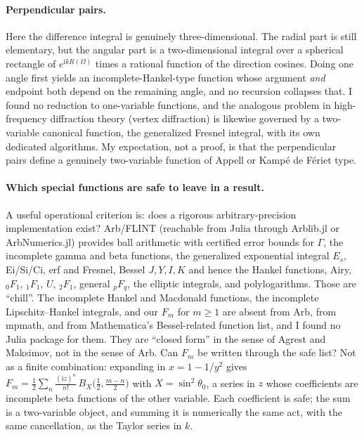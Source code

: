 \documentclass[11pt]{article}
\theoremstyle{remark}
\newcommand{\ii}{\mathrm{i}}
\begin{document}
\paragraph{Perpendicular pairs.} Here the difference integral is genuinely
three-dimensional. The radial part is still elementary, but the angular part is a
two-dimensional integral over a spherical rectangle of $e^{\ii kR(\Omega)}$ times a
rational function of the direction cosines. Doing one angle first yields an
incomplete-Hankel-type function whose argument \emph{and} endpoint both depend on the
remaining angle, and no recursion collapses that. I found no reduction to
one-variable functions, and the analogous problem in high-frequency diffraction
theory (vertex diffraction) is likewise governed by a two-variable canonical
function, the generalized Fresnel integral, with its own dedicated algorithms. My
expectation, not a proof, is that the perpendicular pairs define a genuinely
two-variable function of Appell or Kamp\'e de F\'eriet type.

\paragraph{Which special functions are safe to leave in a result.} A useful
operational criterion is: does a rigorous arbitrary-precision implementation exist?
Arb/FLINT (reachable from Julia through Arblib.jl or ArbNumerics.jl) provides ball
arithmetic with certified error bounds for $\Gamma$, the incomplete gamma and beta
functions, the generalized exponential integral $E_s$, Ei/Si/Ci, erf and Fresnel,
Bessel $J,Y,I,K$ and hence the Hankel functions, Airy, ${}_0F_1$, ${}_1F_1$, $U$,
${}_2F_1$, general ${}_pF_q$, the elliptic integrals, and polylogarithms. Those are
``chill''. The incomplete Hankel and Macdonald functions, the incomplete
Lipschitz--Hankel integrals, and our $F_m$ for $m\ge 1$ are absent from Arb, from
mpmath, and from Mathematica's Bessel-related function list, and I found no Julia
package for them. They are ``closed form'' in the sense of Agrest and Maksimov, not in
the sense of Arb. Can $F_m$ be written through the safe list? Not as a finite
combination: expanding in $x = 1 - 1/y^2$ gives
$F_m = \tfrac12\sum_n \frac{(\ii z)^n}{n!}\,B_X\bigl(\tfrac12, \tfrac{m-n}{2}\bigr)$
with $X = \sin^2\theta_0$, a series in $z$ whose coefficients are incomplete beta
functions of the other variable. Each coefficient is safe; the sum is a two-variable
object, and summing it is numerically the same act, with the same cancellation, as
the Taylor series in $k$.
\end{document}
